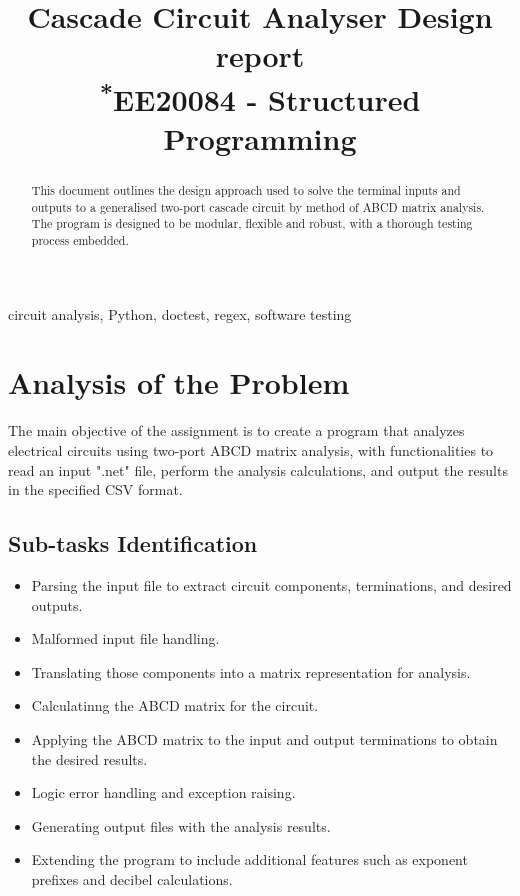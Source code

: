 \documentclass[conference]{IEEEtran}
\begin{document}
\title{Cascade Circuit Analyser Design report\\
{\footnotesize \textsuperscript{*}EE20084 - Structured Programming}
}

\author{
}
\maketitle

\begin{abstract}
This document outlines the design approach used to solve the terminal inputs and outputs to a generalised two-port cascade
circuit by method of ABCD matrix analysis. The program is designed to be modular, flexible and robust, with a thorough testing process
embedded.
\end{abstract}

\begin{IEEEkeywords}
circuit analysis, Python, doctest, regex, software testing
\end{IEEEkeywords}

\tableofcontents

\section{Analysis of the Problem}
The main objective of the assignment is to create a program that analyzes 
electrical circuits using two-port ABCD matrix analysis, with functionalities to read an 
input ".net" file, perform the analysis calculations, and output the results in the specified CSV format.

\subsection{Sub-tasks Identification}
\begin{itemize}
    \item Parsing the input file to extract circuit components, terminations, and desired outputs.
    \item Malformed input file handling.
    \item Translating those components into a matrix representation for analysis.
    \item Calculatinng the ABCD matrix for the circuit.
    \item Applying the ABCD matrix to the input and output terminations to obtain the desired results.
    \item Logic error handling and exception raising.
    \item Generating output files with the analysis results.
    \item Extending the program to include additional features such as exponent prefixes and decibel calculations.
\end{itemize}
\end{document}
